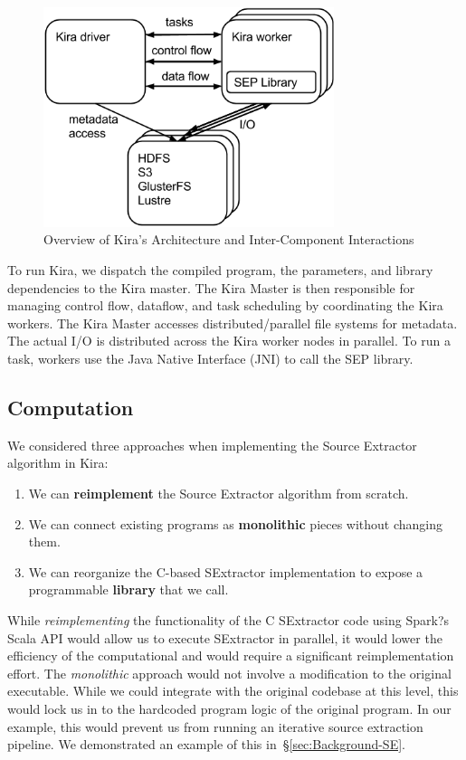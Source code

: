 \documentclass[conference]{IEEEtran}
\newcommand{\up}{\vspace*{-1em}}
\begin{document}
\begin{figure}[t]
	\begin{center}
		\includegraphics[width=85mm]{pictures/Kira-Architecture}
		\caption{Overview of Kira's Architecture and Inter-Component Interactions}
		\label{fig:architecture}
		\up\up
  	\end{center}
\end{figure}


To run Kira, we dispatch the compiled program, the parameters, and library dependencies to the Kira master.
The Kira Master is then responsible for managing control flow, dataflow, and task scheduling 
by coordinating the Kira workers. 
The Kira Master accesses distributed/parallel file systems for metadata.
The actual I/O is distributed across the Kira worker nodes in
parallel. To run a task, workers use the Java Native Interface (JNI) to call the SEP library.

\subsection{Computation}
\label{sec:Design-Computation}
We considered three approaches when implementing the Source Extractor algorithm in Kira:

\begin{enumerate}
\item We can \textbf{reimplement} the Source Extractor algorithm from scratch.
\item We can connect existing programs as \textbf{monolithic} pieces without changing them.
\item We can reorganize the C-based SExtractor implementation to expose a programmable
\textbf{library} that we call.
\end{enumerate}

While \emph{reimplementing} the functionality of the C SExtractor code using Spark?s Scala API 
would allow us to execute SExtractor in parallel, it would lower the efficiency of the computational 
and would require a significant reimplementation effort.
The \emph{monolithic} approach would not involve a modification to the original executable. While we could 
integrate with the original codebase at this level, this would lock us in to the hardcoded program logic 
of the original program. In our example, this would prevent us from running an iterative source extraction 
pipeline.  We demonstrated an example of this in~\S\ref{sec:Background-SE}.
\end{document}
